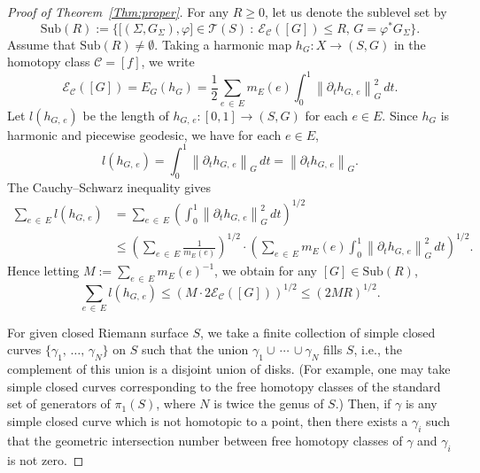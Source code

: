 \documentclass[11pt]{article}
\theoremstyle{definition}
\numberwithin{equation}{section}
\newcommand{\g}{\gamma}
\renewcommand{\SS}{\Sigma}
\newcommand{\f}{\varphi}
\newcommand{\Cc}{\mathcal{C}}
\newcommand{\Ec}{\mathcal{E}}
\newcommand{\Tc}{\mathcal{T}}
\newcommand*\Sub{\mathrm{Sub}}
\begin{document}
\begin{proof}[{Proof of Theorem~\ref{Thm:proper}}]
For any $R \ge 0$, let us denote the sublevel set by
\[
\Sub(R):=\Big\{\big[(\SS, G_\SS), \f\big] \in \Tc(S) \ : \ \Ec_\Cc([G]) \le R, \, G=\f^\ast G_\SS\Big\}.
\]
Assume that $\Sub(R) \neq \emptyset$. Taking a harmonic map $h_G: X \to (S, G)$ in the homotopy class $\Cc=[f]$, we write
\[
\Ec_\Cc([G])=E_G(h_G)=\frac{1}{2}\sum_{e\,\in \,E}m_E(e)\int_0^1\left\|\partial_t h_{G,\,e}\right\|_G^2\, dt.
\]
Let $l(h_{G,\,e})$ be the length of $h_{G, \,e}:[0, 1] \to (S, G)$ for each $e \in E$. Since $h_G$ is harmonic and piecewise geodesic, we have for each $e \in E$,
\[
l\left(h_{G,\,e}\right)=\int_0^1\left\|\partial_t h_{G,\,e}\right\|_G\, dt=\left\|\partial_t h_{G,\,e}\right\|_G.
\]
The Cauchy--Schwarz inequality gives
\begin{align*}
\sum_{e\,\in\,E}l\left(h_{G,\,e}\right) &= \sum_{e\,\in\,E}\left(\int_0^1 \left\|\partial_t h_{G,\,e}\right\|_G^2 \, dt\right)^{1/2} \\
&\le \left(\sum_{e\,\in\,E}\frac{1}{m_E(e)}\right)^{1/2}\cdot \left(\sum_{e\,\in\,E}m_E(e)\int_0^1 \left\|\partial_t h_{G,\,e}\right\|_G^2 \, dt\right)^{1/2}.
\end{align*}
Hence letting $M:=\sum_{e\,\in\,E}m_E(e)^{-1}$, we obtain for any $[G] \in \Sub(R)$,
\begin{equation}\label{Eq:length}
\sum_{e\,\in\,E}l\left(h_{G,\,e}\right) \le \left(M\cdot 2\Ec_{\Cc}([G])\right)^{1/2} \le (2 MR)^{1/2}.
\end{equation}


For given closed Riemann surface $S$, we take a finite collection of simple closed curves $\{\g_1,\,\dots,\,\g_N\}$ on $S$ such that the union $\g_1 \cup\,\cdots\,\cup \g_N$ fills $S$, i.e., the complement of this union is a disjoint union of disks. (For example, one may take simple closed curves corresponding to the free homotopy classes of the standard set of generators of $\pi_1(S)$, where $N$ is twice the genus of $S$.) Then, if $\g$ is any simple closed curve which is not homotopic to a point, then there exists a $\g_i$ such that the geometric intersection number between free homotopy classes of $\g$ and $\g_i$ is not zero.




\end{proof}
\end{document}
